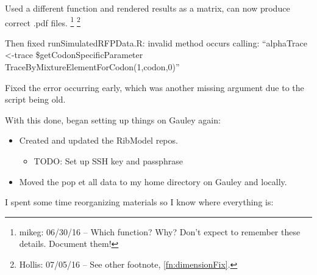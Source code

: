\documentclass[12pt,hyperref]{labbook}
\newcommand{\sep}{\discretionary{}{}{}} %
\begin{document}
Used a different function and rendered results as a matrix, can now produce correct .pdf files.
\footnote{mikeg: 06/30/16 -- Which function? Why?  
Don't expect to remember these details.  
Document them!
}
\footnote{Hollis: 07/05/16 -- See other footnote, \ref{fn:dimensionFix}.}

Then fixed run\sep Simulated\sep RFP\sep Data.R: invalid method occurs calling:
\enquote{alpha\sep Trace \sep \textless-\sep trace\sep 
\$\sep get\sep Codon\sep Specific\sep Parameter\sep 
Trace\sep By\sep Mixture\sep Element\sep For\sep Codon\sep (1\sep,\sep codon\sep,\sep 0)}

Fixed the error occurring early, which was another missing argument due to the script being old.

With this done, began setting up things on Gauley again:
\begin{itemize}
    \item Created and updated the RibModel repos.
    \begin{itemize}
        \item TODO: Set up SSH key and passphrase
    \end{itemize}
    \item Moved the pop et all data to my home directory on Gauley and locally.
\end{itemize}

I spent some time reorganizing materials so I know where everything is:
\end{document}

